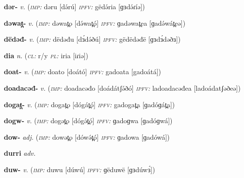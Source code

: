 \newentry
\headword\textbf{dər-}  %
\ipa{[dɘr-]}
\synpos\textit{v.} 
\imperative(\textit {\textsc{imp:}} dəru [də́rú]
\imperfective\textit {\textsc{ipfv:}} gëdə́ria [ɡɜdə́ɾíə])

\newentry
\headword\textbf{dəwat̪-}  
\ipa{[də́wát̪-]}
\synpos\textit{v.} 
\imperative(\textit {\textsc{imp:}} dəwat̪o [də́wat̪ó]
\imperfective\textit {\textsc{ipfv:}} ɡadəwat̪ea [ɡadə́wát̪eə])

\newentry
\headword\textbf{dëdəđ-}  
\ipa{[dɜ́dəð-]}
\synpos\textit{v.} 
\imperative(\textit {\textsc{imp:}} dëdəđu [dɜ́də́ðú]
\imperfective\textit {\textsc{ipfv:}} gëdëdəđë [ɡɜdɜ́dəðɜ])

\newentry
\headword\textbf{dia}  
\ipa{[diə]}
\synpos\textit{n.} 
\class(\textit{\textsc{cl:}} {r/y}
\plural\textit{\textsc{pl:}} iria [iɾiə])

\newentry
\headword\textbf{doat-}  
\ipa{[doát-]}
\synpos\textit{v.} 
\imperative(\textit {\textsc{imp:}} doato [doátó]
\imperfective\textit {\textsc{ipfv:}} gadoata [gadoátá])

\newentry
\headword\textbf{doadacəđ-}  
\synpos\textit{v.} 
\imperative(\textit {\textsc{imp:}} doadacəđo [doádátʃə́ðó]
\imperfective\textit {\textsc{ipfv:}} ladoadacəđea [ladoádatʃəðeə])


\newentry
\headword\textbf{dogat̪-}  
\ipa{[dógát̪-]}
\synpos\textit{v.} 
\imperative(\textit {\textsc{imp:}} dogat̪o [dógát̪ó]
\imperfective\textit {\textsc{ipfv:}} gadogat̪a [ɡadóɡát̪a])

\newentry
\headword\textbf{dogw-}  
\ipa{[dógw-]}
\synpos\textit{v.} 
\imperative(\textit {\textsc{imp:}} dogət̪o [dógə́t̪ó]
\imperfective\textit {\textsc{ipfv:}} ɡadoɡwa [ɡadóɡwá])

\newentry
\headword\textbf{dow-}  
\ipa{[dów-]}
\synpos\textit{adj.} 
\imperative(\textit {\textsc{imp:}} dowət̪o [dówə́t̪ó]
\imperfective\textit {\textsc{ipfv:}} ɡadowa [ɡadówá])

\newentry
\headword\textbf{durri}  
\ipa{[durri]}
\synpos\textit{adv.} 

\newentry
\headword\textbf{duw-}  
\ipa{[dúw-]}
\synpos\textit{v.} 
\imperative(\textit {\textsc{imp:}} duwu [dúwú]
\imperfective\textit {\textsc{ipfv:}} ɡëduwë [ɡɜdúwɜ́])

